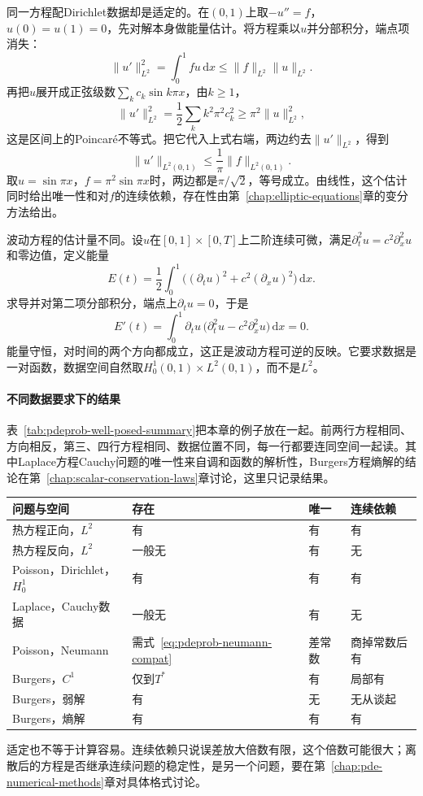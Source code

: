 同一方程配Dirichlet数据却是适定的。在$(0,1)$上取$-u''=f$，$u(0)=u(1)=0$，先对解本身做能量估计。将方程乘以$u$并分部积分，端点项消失：
\[
  \lVert u'\rVert_{L^{2}}^{2}=\int_0^{1}fu\,\mathrm{d}x\leq\lVert f\rVert_{L^{2}}\lVert u\rVert_{L^{2}}.
\]
再把$u$展开成正弦级数$\sum_kc_k\sin k\pi x$，由$k\geq1$，
\[
  \lVert u'\rVert_{L^{2}}^{2}=\frac12\sum_kk^{2}\pi^{2}c_k^{2}\geq\pi^{2}\lVert u\rVert_{L^{2}}^{2},
\]
这是区间上的Poincaré不等式。把它代入上式右端，两边约去$\lVert u'\rVert_{L^{2}}$，得到
\begin{equation}
  \lVert u'\rVert_{L^{2}(0,1)}\leq\frac{1}{\pi}\lVert f\rVert_{L^{2}(0,1)}.
  \label{eq:pdeprob-poisson-energy}
\end{equation}
取$u=\sin\pi x$，$f=\pi^{2}\sin\pi x$时，两边都是$\pi/\sqrt{2}$，等号成立。由线性，这个估计同时给出唯一性和对$f$的连续依赖，存在性由第~\ref{chap:elliptic-equations}章的变分方法给出。

波动方程的估计量不同。设$u$在$[0,1]\times[0,T]$上二阶连续可微，满足$\partial_t^{2}u=c^{2}\partial_x^{2}u$和零边值，定义能量
\[
  E(t)=\frac12\int_0^{1}\bigl((\partial_tu)^{2}+c^{2}(\partial_xu)^{2}\bigr)\,\mathrm{d}x.
\]
求导并对第二项分部积分，端点上$\partial_tu=0$，于是
\begin{equation}
  E'(t)=\int_0^{1}\partial_tu\,\bigl(\partial_t^{2}u-c^{2}\partial_x^{2}u\bigr)\,\mathrm{d}x=0.
  \label{eq:pdeprob-wave-energy}
\end{equation}
能量守恒，对时间的两个方向都成立，这正是波动方程可逆的反映。它要求数据是一对函数，数据空间自然取$H_0^{1}(0,1)\times L^{2}(0,1)$，而不是$L^{2}$。

\paragraph{不同数据要求下的结果}
表~\ref{tab:pdeprob-well-posed-summary}把本章的例子放在一起。前两行方程相同、方向相反，第三、四行方程相同、数据位置不同，每一行都要连同空间一起读。其中Laplace方程Cauchy问题的唯一性来自调和函数的解析性，Burgers方程熵解的结论在第~\ref{chap:scalar-conservation-laws}章讨论，这里只记录结果。

\begin{BookInlineTable}
  \centering
  \begin{tabular}{llll}
    \toprule
    问题与空间 & 存在 & 唯一 & 连续依赖\\
    \midrule
    热方程正向，$L^{2}$ & 有 & 有 & 有\\
    热方程反向，$L^{2}$ & 一般无 & 有 & 无\\
    Poisson，Dirichlet，$H_0^{1}$ & 有 & 有 & 有\\
    Laplace，Cauchy数据 & 一般无 & 有 & 无\\
    Poisson，Neumann & 需式~\eqref{eq:pdeprob-neumann-compat} & 差常数 & 商掉常数后有\\
    Burgers，$C^{1}$ & 仅到$T^{*}$ & 有 & 局部有\\
    Burgers，弱解 & 有 & 无 & 无从谈起\\
    Burgers，熵解 & 有 & 有 & 有\\
    \bottomrule
  \end{tabular}
  \caption{同一方程在不同数据与空间要求下的适定性。}
  \label{tab:pdeprob-well-posed-summary}
\end{BookInlineTable}

适定也不等于计算容易。连续依赖只说误差放大倍数有限，这个倍数可能很大；离散后的方程是否继承连续问题的稳定性，是另一个问题，要在第~\ref{chap:pde-numerical-methods}章对具体格式讨论。
